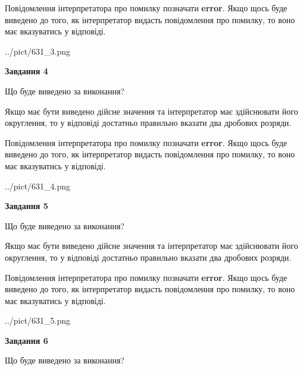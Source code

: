\documentclass[12pt, ukrainian]{article}
\begin{document}
{\begin {Large}
Повідомлення інтерпретатора про помилку позначати \textbf{error}.
Якщо щось буде виведено до того, як інтерпретатор видасть повідомлення про помилку, 
то воно має вказуватись у відповіді. \par

\begin{center}
	{../pict/631_3.png}
\end{center}
\newpage

{\begin {center}\textbf{Завдання 4}\end {center}}\par
Що буде виведено за виконання? \par

Якщо має бути виведено дійсне значення та інтерпретатор має здійснювати його округлення, 
то у відповіді достатньо правильно вказати два дробових розряди.

Повідомлення інтерпретатора про помилку позначати \textbf{error}.
Якщо щось буде виведено до того, як інтерпретатор видасть повідомлення про помилку, 
то воно має вказуватись у відповіді. \par

\begin{center}
	{../pict/631_4.png}
\end{center}
\newpage

{\begin {center}\textbf{Завдання 5}\end {center}}\par
Що буде виведено за виконання? \par

Якщо має бути виведено дійсне значення та інтерпретатор має здійснювати його округлення, 
то у відповіді достатньо правильно вказати два дробових розряди.

Повідомлення інтерпретатора про помилку позначати \textbf{error}.
Якщо щось буде виведено до того, як інтерпретатор видасть повідомлення про помилку, 
то воно має вказуватись у відповіді. \par

\begin{center}
	{../pict/631_5.png}
\end{center}
\newpage

{\begin {center}\textbf{Завдання 6}\end {center}}\par
Що буде виведено за виконання? \par


\end{Large}}
\end{document}
